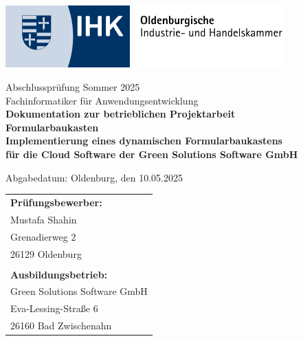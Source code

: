 \documentclass[a4paper,11pt]{article}
\begin{document}
\pagestyle{fancy}
\fancyhf{}
\fancyfoot[C]{\thepage}
\renewcommand{\headrulewidth}{0.4pt}
\renewcommand{\footrulewidth}{0.4pt}

\begin{titlepage}
\thispagestyle{empty}

\begin{center}
\includegraphics[width=0.8\textwidth]{ihk_logo}

\vspace{0.5cm}
{\large Abschlussprüfung Sommer 2025}\\
\vspace{0.5cm}
{\large Fachinformatiker für Anwendungsentwicklung}\\
\vspace{1cm}
{\Large\textbf{Dokumentation zur betrieblichen Projektarbeit}}\\
\vspace{1cm}
{\Huge\textbf{Formularbaukasten}}\\
\vspace{0.5cm}
{\Large\textbf{Implementierung eines dynamischen Formularbaukastens}}\\
\vspace{0.1cm}
{\Large\textbf{für die Cloud Software der Green Solutions Software GmbH}}\\
\end{center}

\vspace{0.3cm}
\begin{center}
{\large Abgabedatum: Oldenburg, den 10.05.2025}
\end{center}

\vspace{0.3cm}
\begin{center}
\begin{tabular}{l}
{\large\textbf{Prüfungsbewerber:}}\\
{\large Mustafa Shahin}\\
{\large Grenadierweg 2}\\
{\large 26129 Oldenburg}\\
\\
{\large\textbf{Ausbildungsbetrieb:}}\\
{\large Green Solutions Software GmbH}\\
{\large Eva-Lessing-Straße 6}\\
{\large 26160 Bad Zwischenahn}
\end{tabular}
\end{center}


\end{titlepage}
\end{document}
